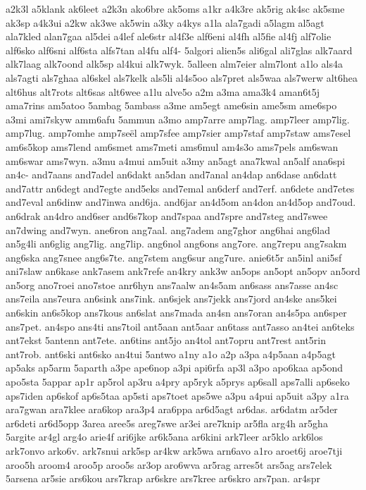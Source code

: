 {a2k3l
a5klank
ak6leet
a2k3n
ako6bre
ak5oms
a1kr
a4k3re
ak5rig
ak4sc
ak5sme
ak3sp
a4k3ui
a2kw
ak3we
ak5win
a3ky
a4kys
a1la
ala7gadi
a5lagm
al5agt
ala7kled
alan7gaa
al5dei
a4lef
ale6str
al4f3e
alf6eni
al4fh
al5fie
al4fj
alf7olie
alf6sko
alf6sni
alf6sta
alfs7tan
al4fu
alf4-
5algori
alien5s
ali6gal
ali7glas
alk7aard
alk7laag
alk7oond
alk5sp
al4kui
alk7wyk.
5alleen
alm7eier
alm7lont
a1lo
als4a
als7agti
als7ghaa
al6skel
als7kelk
als5li
al4s5oo
als7pret
als5waa
als7werw
alt6hea
alt6hus
alt7rots
alt6sas
alt6wee
a1lu
alve5o
a2m
a3ma
ama3k4
aman6t5j
ama7rins
am5atoo
5ambag
5ambass
a3me
am5egt
ame6sin
ame5sm
ame6spo
a3mi
ami7skyw
amm6afu
5ammun
a3mo
amp7arre
amp7lag.
amp7leer
amp7lig.
amp7lug.
amp7omhe
amp7seël
amp7sfee
amp7sier
amp7staf
amp7staw
ams7esel
am6s5kop
ams7lend
am6smet
ams7meti
ams6mul
am4s3o
ams7pels
am6swan
am6swar
ams7wyn.
a3mu
a4mui
am5uit
a3my
an5agt
ana7kwal
an5alf
ana6spi
an4c-
and7aans
and7adel
an6dakt
an5dan
and7anal
an4dap
an6dase
an6datt
and7attr
an6degt
and7egte
and5eks
and7emal
an6derf
and7erf.
an6dete
and7etes
and7eval
an6dinw
and7inwa
and6ja.
and6jar
an4d5om
an4don
an4d5op
and7oud.
an6drak
an4dro
and6ser
and6s7kop
and7spaa
and7spre
and7steg
and7swee
an7dwing
and7wyn.
ane6ron
ang7aal.
ang7adem
ang7ghor
ang6hai
ang6lad
an5g4li
an6glig
ang7lig.
ang7lip.
ang6nol
ang6ons
ang7ore.
ang7repu
ang7sakm
ang6ska
ang7snee
ang6s7te.
ang7stem
ang6sur
ang7ure.
anie6t5r
an5inl
ani5sf
ani7slaw
an6kase
ank7asem
ank7refe
an4kry
ank3w
an5ops
an5opt
an5opv
an5ord
an5org
ano7roei
ano7stoe
anr6hyn
ans7aalw
an4s5am
an6sass
ans7asse
an4sc
ans7eila
ans7eura
an6sink
ans7ink.
an6sjek
ans7jekk
ans7jord
an4ske
ans5kei
an6skin
an6s5kop
ans7kous
an6slat
ans7mada
an4sn
ans7oran
an4s5pa
an6sper
ans7pet.
an4spo
ans4ti
ans7toil
ant5aan
ant5aar
an6tass
ant7asso
an4tei
an6teks
ant7ekst
5antenn
ant7ete.
an6tins
ant5jo
an4tol
ant7opru
ant7rest
ant5rin
ant7rob.
ant6ski
ant6sko
an4tui
5antwo
a1ny
a1o
a2p
a3pa
a4p5aan
a4p5agt
ap5aks
ap5arm
5aparth
a3pe
ape6nop
a3pi
api6rfa
ap3l
a3po
apo6kaa
ap5ond
apo5sta
5appar
ap1r
ap5rol
ap3ru
a4pry
ap5ryk
a5prys
ap6sall
aps7alli
ap6seko
aps7iden
ap6skof
ap6s5taa
ap5sti
aps7toet
aps5we
a3pu
a4pui
ap5uit
a3py
a1ra
ara7gwan
ara7klee
ara6kop
ara3p4
ara6ppa
ar6d5agt
ar6das.
ar6datm
ar5der
ar6deti
ar6d5opp
3area
aree5s
areg7swe
ar3ei
are7knip
ar5fla
arg4h
ar5gha
5argite
ar4gl
arg4o
arie4f
ari6jke
ar6k5ana
ar6kini
ark7leer
ar5klo
ark6los
ark7onvo
arko6v.
ark7snui
ark5sp
ar4kw
ark5wa
arn6avo
a1ro
aroet6j
aroe7tji
aroo5h
aroom4
aroo5p
aroo5s
ar3op
aro6wva
ar5rag
arres5t
ars5ag
ars7elek
5arsena
ar5sie
ars6kou
ars7krap
ar6skre
ars7kree
ar6skro
ars7pan.
ar4spr
}
